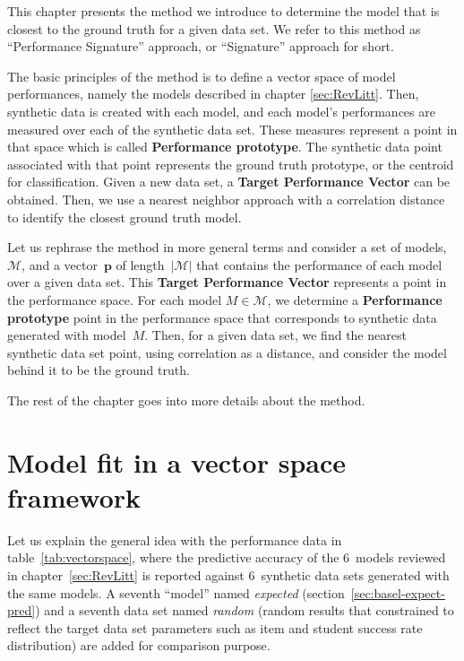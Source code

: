 \label{sec:Approach}

This chapter presents the method we introduce to determine the model that is closest to the ground truth for a given data set.  We refer to this method as ``Performance Signature'' approach, or ``Signature'' approach for short. 

The basic principles of the method is to define a vector space of model performances, namely the models described in chapter \ref{sec:RevLitt}.  Then, synthetic data is created with each model, and each model's performances are measured over each of the synthetic data set.  These measures represent a point in that space which is called \textbf{Performance prototype}. The synthetic data point associated with that point represents the ground truth prototype, or the centroid for classification.  Given a new data set, a \textbf{Target Performance Vector} can be obtained. Then, we use a nearest neighbor approach with a correlation distance to identify the closest ground truth model.

Let us rephrase the method in more general terms and consider a set of models, $\mathcal{M}$, and a vector~$\mathbf{p}$ of length~$|\mathcal{M}|$ that contains the performance of each model over a given data set.  This \textbf{Target Performance Vector} represents a point in the performance space.  For each model $M \in \mathcal{M}$, we determine a \textbf{Performance prototype} point in the performance space that corresponds to synthetic data generated with model~$M$.  Then, for a given data set, we find the nearest synthetic data set point, using correlation as a distance, and consider the model behind it to be the ground truth.


The rest of the chapter goes into more details about the method.

\section{Model fit in a vector space framework}

Let us explain the general idea with the performance data in table~\ref{tab:vectorspace}, where the predictive accuracy of the 6~models reviewed in chapter~\ref{sec:RevLitt} is reported against 6~synthetic data sets generated with the same models.  A seventh ``model'' named \textit{expected} (section~\ref{sec:basel-expect-pred}) and a seventh data set named \textit{random} (random results that constrained to reflect the target data set parameters such as item and student success rate distribution) are added for comparison purpose.  

